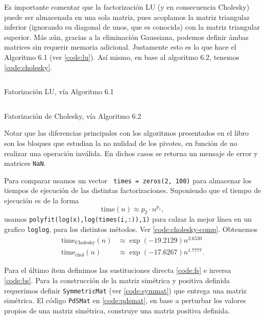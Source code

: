 Es importante comentar que la factorizaci\'on LU (y en consecuencia Cholesky) puede ser almacenada en una sola matriz, pues acoplamos la matriz triangular inferior (ignorando su diagonal de unos, que es conocida) con la matriz triangular superior. M\'as a\'un, gracias a la eliminaci\'on Gaussiana, podemos definir \'ambas matrices sin requerir memoria adicional. Justamente esto es lo que hace el Algoritmo 6.1 (ver \eqref{code:lu}). As\'i mismo, en base al algoritmo 6.2, tenemos \eqref{code:cholesky}.

\begin{listing}[hb!]
    \inputminted[breaklines=true]{octave}{LUFacto.m}
    \caption{Fatorizaci\'on LU, v\'ia Algoritmo 6.1}
    \label{code:lu}
\end{listing}

\begin{listing}[hb!]
    \inputminted[breaklines=true]{octave}{Cholesky.m}
    \caption{Fatorizaci\'on de Cholesky, v\'ia Algoritmo 6.2}
    \label{code:cholesky}
\end{listing}

Notar que las diferencias principales con los algoritmos presentados en el libro son los bloques que estudian la no nulidad de los pivotes, en funci\'on de no realizar una operaci\'on inv\'alida. En dichos casos se retorna un mensaje de error y matrices \texttt{NaN}.

Para comparar usamos un vector \texttt{ times = zeros(2, 100)} para almacenar los tiempos de ejecuci\'on de las distintas factorizaciones. Suponiendo que el tiempo de ejecuci\'on es de la forma
\[
    \mathrm{time}(n) \approx p_2 \cdot n^{p_1},
\]
usamos \texttt{polyfit(log(x),log(times(i,:)),1)} para calzar la mejor l\'inea en un grafico \texttt{loglog}, para los distintos m\'etodos. Ver \eqref{code:cholesky-comp}. Obtenemos
\begin{align*}
    \mathrm{time}_\mathrm{Cholesky}(n) & \approx \exp(-19.2129)n^{2.6530}\\
    \mathrm{time}_\mathrm{chol}(n) & \approx \exp(-17.6267)n^{1.7777}.
\end{align*}

Para el \'ultimo \'item definimos las sustituciones directa \eqref{code:fs} e inversa \eqref{code:bs}. Para la construcci\'on de la matriz sim\'etrica y positiva definida requerimos definir \texttt{SymmetricMat} (ver \eqref{code:symmat}) que entrega una matriz sim\'etrica. El c\'odigo \texttt{PdSMat} en \eqref{code:pdsmat}, en base a perturbar los valores propios de una matriz sim\'etrica, construye una matriz positiva definida.

